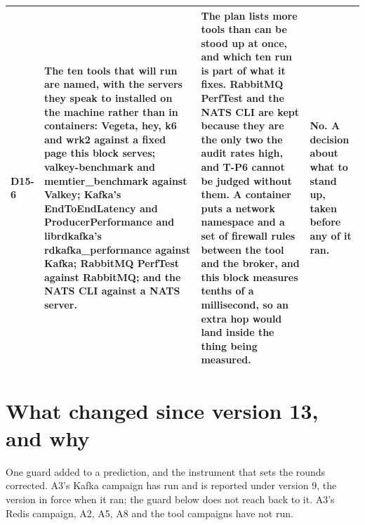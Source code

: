 \documentclass[11pt]{article}
\begin{document}
{\begin{longtable}{@{}p{1.1cm} >{\raggedright\arraybackslash}p{6.1cm} >{\raggedright\arraybackslash}p{6.0cm} >{\raggedright\arraybackslash}p{2.2cm}@{}}
D15-6 & The ten tools that will run are named, with the servers they speak to installed on the machine rather than in containers: Vegeta, hey, k6 and wrk2 against a fixed page this block serves; valkey-benchmark and memtier\_benchmark against Valkey; Kafka's EndToEndLatency and ProducerPerformance and librdkafka's rdkafka\_performance against Kafka; RabbitMQ PerfTest against RabbitMQ; and the NATS CLI against a NATS server. & The plan lists more tools than can be stood up at once, and which ten run is part of what it fixes. RabbitMQ PerfTest and the NATS CLI are kept because they are the only two the audit rates high, and T-P6 cannot be judged without them. A container puts a network namespace and a set of firewall rules between the tool and the broker, and this block measures tenths of a millisecond, so an extra hop would land inside the thing being measured. & \textbf{No.} A decision about what to stand up, taken before any of it ran. \\
\bottomrule
\end{longtable}}

\section*{What changed since version 13, and why}
One guard added to a prediction, and the instrument that sets the rounds corrected. A3's Kafka campaign has run and is reported under version 9, the version in force when it ran; the guard below does not reach back to it. A3's Redis campaign, A2, A5, A8 and the tool campaigns have not run.
\end{document}
